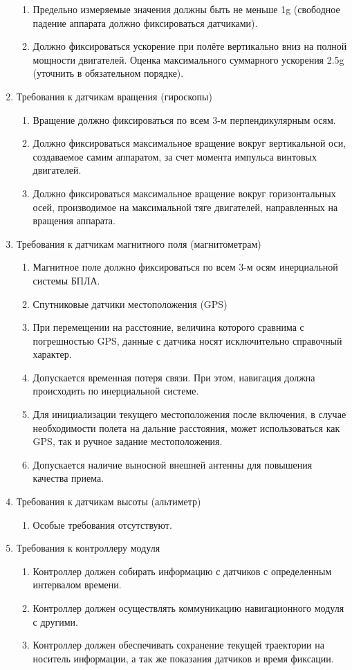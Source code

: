 \documentclass[utf8]{report}
\begin{document}
\begin{enumerate}
\begin{enumerate}
    \item Предельно измеряемые значения должны быть не меньше 1g (свободное падение аппарата должно фиксироваться датчиками).
    \item Должно фиксироваться ускорение при полёте вертикально вниз на полной мощности двигателей. Оценка максимального суммарного ускорения 2.5g (уточнить в обязательном порядке).
  \end{enumerate}
  \item Требования к датчикам вращения (гироскопы)
  \begin{enumerate}
    \item Вращение должно фиксироваться по всем 3-м перпендикулярным осям.
    \item Должно фиксироваться максимальное вращение вокруг вертикальной оси, создаваемое самим аппаратом, за счет момента импульса винтовых двигателей.
    \item Должно фиксироваться максимальное вращение вокруг горизонтальных осей, производимое на максимальной тяге двигателей, направленных на вращения аппарата.
  \end{enumerate}
  \item Требования к датчикам магнитного поля (магнитометрам)
  \begin{enumerate}
    \item Магнитное поле должно фиксироваться по всем 3-м осям инерциальной системы БПЛА.
    \item Спутниковые датчики местоположения (GPS)
    \item При перемещении на расстояние, величина которого сравнима с погрешностью GPS, данные с датчика носят исключительно справочный характер.
    \item Допускается временная потеря связи. При этом, навигация должна происходить по инерциальной системе.
    \item Для инициализации текущего местоположения после включения, в случае необходимости полета на дальние расстояния, может использоваться как GPS,  так и ручное задание местоположения.
    \item Допускается наличие выносной внешней антенны для повышения качества приема.
  \end{enumerate}
  \item Требования к датчикам высоты (альтиметр)
  \begin{enumerate}
    \item Особые требования отсутствуют.
  \end{enumerate}
  \item Требования к контроллеру модуля
  \begin{enumerate}
    \item Контроллер должен собирать информацию с датчиков с определенным интервалом времени.
    \item Контроллер должен осуществлять коммуникацию навигационного модуля с другими.
    \item Контроллер должен обеспечивать сохранение текущей траектории на носитель информации, а так же показания датчиков и время фиксации.
  \end{enumerate}
\end{enumerate}
\end{document}
